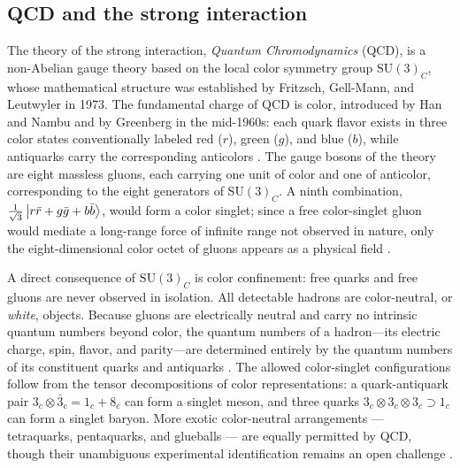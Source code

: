 \subsection{QCD and the strong interaction}
\label{subsec:qcd-strong-interaction}
 
The theory of the strong interaction, \emph{Quantum Chromodynamics} (QCD), is a
non-Abelian gauge theory based on the local color symmetry group
$\mathrm{SU(3)}_{C}$, whose mathematical structure was established by Fritzsch,
Gell-Mann, and Leutwyler in 1973. The fundamental charge of QCD is color,
introduced by Han and Nambu and by Greenberg in the mid-1960s: each quark
flavor exists in three color states conventionally labeled red ($r$), green ($g$),
and blue ($b$), while antiquarks carry the corresponding anticolors
\cite[Ch.~10]{Amsler2018}. The gauge bosons of the theory are eight massless
gluons, each carrying one unit of color and one of anticolor, corresponding to the
eight generators of $\mathrm{SU(3)}_{C}$. A ninth combination,
$\tfrac{1}{\sqrt{3}}\ket{r\bar{r} + g\bar{g} + b\bar{b}}$, would form a color
singlet; since a free color-singlet gluon would mediate a long-range force of
infinite range not observed in nature, only the eight-dimensional color octet of
gluons appears as a physical field \cite[Ch.~10]{Amsler2018}.
 
A direct consequence of $\mathrm{SU(3)}_{C}$ is color confinement: free quarks and
free gluons are never observed in isolation. All detectable hadrons are
color-neutral, or \emph{white}, objects. Because gluons are electrically neutral
and carry no intrinsic quantum numbers beyond color, the quantum numbers of a
hadron---its electric charge, spin, flavor, and parity---are determined entirely by
the quantum numbers of its constituent quarks and antiquarks
\cite[Ch.~1]{Amsler2018}. The allowed color-singlet configurations follow from
the tensor decompositions of color representations: a quark-antiquark pair
$3_c \otimes \bar{3}_c = 1_c + 8_c$ can form a singlet meson, and three quarks
$3_c \otimes 3_c \otimes 3_c \supset 1_c$ can form a singlet baryon. More exotic
color-neutral arrangements --- tetraquarks, pentaquarks, and glueballs --- are
equally permitted by QCD, though their unambiguous experimental identification
remains an open challenge \cite[Ch.~10]{Amsler2018}.

